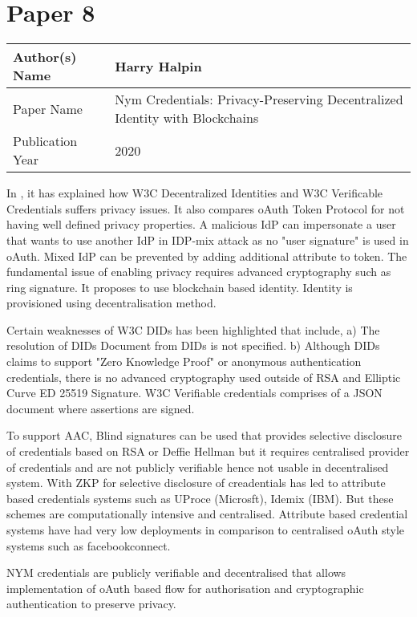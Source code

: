 \section{Paper 8}
    \begin{center}
    \begin{tabular}{ | m{5em} | m{25em} |} 
      \hline
      Author(s) Name &  Harry Halpin\\ 
      \hline
      Paper Name &  Nym Credentials: Privacy-Preserving Decentralized Identity with Blockchains\\ 
      \hline
      Publication Year &  2020\\ 
      \hline
    \end{tabular}
    \end{center}
    In \cite{9150191}, it has explained how W3C Decentralized Identities and W3C Verificable Credentials suffers privacy issues. It also compares oAuth Token Protocol for not having well defined privacy properties. A malicious \ac{IdP} can impersonate a user that wants to use another \ac{IdP} in IDP-mix attack as no "user signature" is used in oAuth. Mixed \ac{IdP} can be prevented by adding additional attribute to token. The fundamental issue of enabling privacy requires advanced cryptography such as ring signature. It proposes to use blockchain based identity. Identity is provisioned using decentralisation method.
    \par Certain weaknesses of \ac{W3C} \ac{DIDs} has been highlighted that include, a) The resolution of \ac{DIDs} Document from \ac{DIDs} is not specified. b) Although \ac{DIDs} claims to support "Zero Knowledge Proof" or anonymous authentication credentials, there is no advanced cryptography used outside of RSA and Elliptic Curve ED 25519 Signature.
    W3C Verifiable credentials comprises of a JSON document where assertions are signed.
    \par To support \ac{AAC}, Blind signatures can be used that provides selective disclosure of credentials based on RSA or Deffie Hellman but it requires centralised provider of credentials and are not publicly verifiable hence not usable in decentralised system. With \ac{ZKP} for selective disclosure of creadentials has led to attribute based credentials systems such as UProce (Microsft), Idemix (IBM). But these schemes are computationally intensive and centralised. Attribute based credential systems have had very low deployments in comparison to centralised oAuth style systems such as facebookconnect.
    \par NYM credentials are publicly verifiable and decentralised that allows implementation of oAuth based flow for authorisation and cryptographic authentication to preserve privacy.

